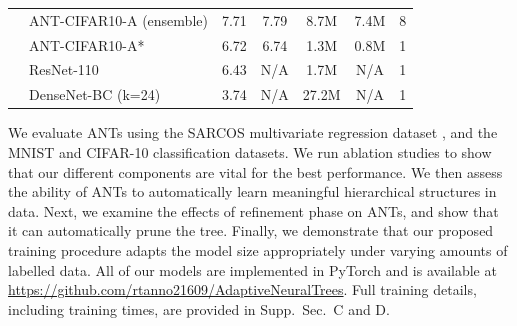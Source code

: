 \begin{table}[t]
\begin{tabular}{|c|l|cc|cc|c|}
		&\cellcolor{gray!10}ANT-CIFAR10-A (ensemble) & \cellcolor{gray!10}7.71 & \cellcolor{gray!10}  7.79 &\cellcolor{gray!10}8.7M&\cellcolor{gray!10}7.4M & \cellcolor{gray!10}8\\
		&\cellcolor{gray!10}ANT-CIFAR10-A* & \cellcolor{gray!10}6.72 & \cellcolor{gray!10} 6.74 &\cellcolor{gray!10}1.3M&\cellcolor{gray!10}0.8M & \cellcolor{gray!10}1\\
        & ResNet-110 \cite{he2016deep} & 6.43 & N/A & 1.7M  &N/A &1 \\
        & DenseNet-BC (k=24) \cite{huang2017densely} & 3.74 & N/A & 27.2M  &N/A &1 \\
		\hline
		\end{tabular}
\end{table}

We evaluate ANTs using the SARCOS multivariate regression dataset \cite{vijayakumar2000locally}, and the MNIST \cite{lecun1998gradient} and CIFAR-10 \cite{krizhevsky2009learning} classification datasets. We run ablation studies to show that our different components are vital for the best performance. We then assess the ability of ANTs to automatically learn meaningful hierarchical structures in data. Next, we examine the effects of refinement phase on ANTs, and show that it can automatically prune the tree. Finally, we demonstrate that our proposed training procedure adapts the model size appropriately under varying amounts of labelled data. All of our models are implemented in PyTorch \cite{paszke2017automatic} and is available at  \url{https://github.com/rtanno21609/AdaptiveNeuralTrees}. Full training details, including training times, are provided in Supp.~Sec.~C and D.
